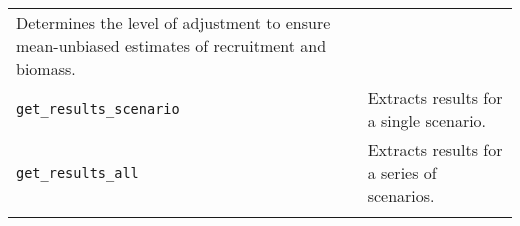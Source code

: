 \documentclass[10pt]{article}
\begin{document}
\begin{thebibliography}{10}
\begin{longtable}[c]{@{}ll@{}}
\begin{minipage}[t]{0.57\columnwidth}
Determines the level of adjustment to ensure mean-unbiased estimates of recruitment and biomass.
\end{minipage}
\\\noalign{\medskip}
\begin{minipage}[t]{0.32\columnwidth}\raggedright
\texttt{get\_results\_scenario}
\end{minipage} & \begin{minipage}[t]{0.57\columnwidth}\raggedright
Extracts results for a single scenario.
\end{minipage}
\\\noalign{\medskip}
\begin{minipage}[t]{0.32\columnwidth}\raggedright
\texttt{get\_results\_all}
\end{minipage} & \begin{minipage}[t]{0.57\columnwidth}\raggedright
Extracts results for a series of scenarios.
\end{minipage}
\\\noalign{\medskip}
\hline
\end{longtable}








\end{thebibliography}
\end{document}
